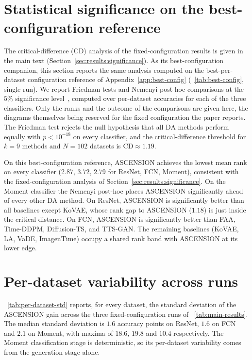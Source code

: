 \section{Statistical significance on the best-configuration reference}
\label{app:cd}

The critical-difference (CD) analysis of the fixed-configuration
results is given in the main text
(Section~\ref{sec:results:significance}). As its best-configuration
companion, this section reports the same analysis computed on the
best-per-dataset configuration reference of
Appendix~\ref{app:best-config} (\tablename~\ref{tab:best-config},
single run). We report Friedman tests and Nemenyi post-hoc
comparisons at the $5\%$ significance
level~\citep{demsar2006statistical}, computed over per-dataset
accuracies for each of the three classifiers. Only the ranks and the
outcome of the comparisons are given here, the diagrams themselves
being reserved for the fixed configuration the paper reports. The Friedman test
rejects the null hypothesis that all DA methods perform equally with
$p < 10^{-18}$ on every classifier, and the critical-difference
threshold for $k = 9$ methods and $N = 102$ datasets is
$\mathrm{CD} \approx 1.19$.


On this best-configuration reference, ASCENSION achieves the lowest
mean rank on every classifier (2.87, 3.72, 2.79 for ResNet, FCN,
Moment), consistent with the fixed-configuration analysis of
Section~\ref{sec:results:significance}. On the Moment
classifier the Nemenyi post-hoc places ASCENSION significantly
ahead of every other DA method. On ResNet, ASCENSION is
significantly better than all baselines except KoVAE, whose
rank gap to ASCENSION ($1.18$) is just inside the critical
distance. On FCN, ASCENSION is significantly better than FAA,
Time-DDPM, Diffusion-TS, and TTS-GAN. The remaining baselines
(KoVAE, LA, VaDE, ImagenTime) occupy a shared rank band with
ASCENSION at its lower edge.



\section{Per-dataset variability across runs}
\label{app:per-dataset-std}

\tablename~\ref{tab:per-dataset-std} reports, for every dataset, the
standard deviation of the ASCENSION gain across the three
fixed-configuration runs of \tablename~\ref{tab:main-results}. The
median standard deviation is $1.6$ accuracy points on ResNet, $1.6$ on
FCN and $2.1$ on Moment, with maxima of $18.6$, $19.8$ and $10.4$
respectively. The Moment classification stage is deterministic, so its
per-dataset variability comes from the generation stage alone.

